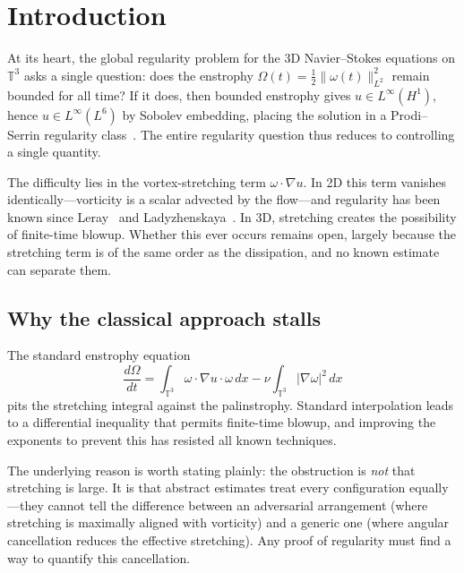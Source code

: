 \documentclass[11pt,a4paper]{article}
\theoremstyle{remark}
\newcommand{\T}{\mathbb{T}}
\begin{document}
\tableofcontents

\section{Introduction}\label{sec:intro}

At its heart, the global regularity problem for the 3D Navier--Stokes equations on $\T^3$ asks a single question: does the enstrophy $\Omega(t) = \frac{1}{2}\|\omega(t)\|_{L^2}^2$ remain bounded for all time?  If it does, then bounded enstrophy gives $u \in L^\infty(H^1)$, hence $u \in L^\infty(L^6)$ by Sobolev embedding, placing the solution in a Prodi--Serrin regularity class~\cite{prodi1959,serrin1962}.  The entire regularity question thus reduces to controlling a single quantity.

The difficulty lies in the vortex-stretching term $\omega \cdot \nabla u$.  In 2D this term vanishes identically---vorticity is a scalar advected by the flow---and regularity has been known since Leray~\cite{leray1934} and Ladyzhenskaya~\cite{ladyzhenskaya1969}.  In 3D, stretching creates the possibility of finite-time blowup.  Whether this ever occurs remains open, largely because the stretching term is of the same order as the dissipation, and no known estimate can separate them.

\subsection{Why the classical approach stalls}

The standard enstrophy equation
\[
  \frac{d\Omega}{dt} = \int_{\T^3} \omega \cdot \nabla u \cdot \omega \,dx - \nu \int_{\T^3} |\nabla \omega|^2 \,dx
\]
pits the stretching integral against the palinstrophy.  Standard interpolation leads to a differential inequality that permits finite-time blowup, and improving the exponents to prevent this has resisted all known techniques.

The underlying reason is worth stating plainly: the obstruction is \emph{not} that stretching is large.  It is that abstract estimates treat every configuration equally---they cannot tell the difference between an adversarial arrangement (where stretching is maximally aligned with vorticity) and a generic one (where angular cancellation reduces the effective stretching).  Any proof of regularity must find a way to quantify this cancellation.
\end{document}
